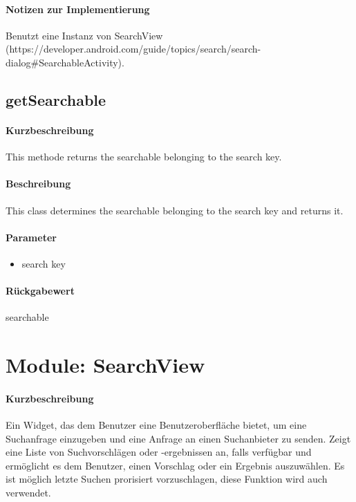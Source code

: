 \paragraph*{Notizen zur Implementierung}
Benutzt eine Instanz von SearchView (https://developer.android.com/guide/topics/search/search-dialog#SearchableActivity).

\subsection{getSearchable}%
\paragraph*{Kurzbeschreibung}
This methode returns the searchable belonging to the search key.
\paragraph*{Beschreibung}
This class determines the searchable belonging to the search key and returns it.
\paragraph*{Parameter}
\begin{itemize}
    \item search key
\end{itemize}
\paragraph*{Rückgabewert}
searchable


\section{Module: SearchView}
\paragraph*{Kurzbeschreibung}
Ein Widget, das dem Benutzer eine Benutzeroberfläche bietet, um eine Suchanfrage einzugeben und eine Anfrage an einen Suchanbieter zu senden. 
Zeigt eine Liste von Suchvorschlägen oder -ergebnissen an, falls verfügbar 
und ermöglicht es dem Benutzer, einen Vorschlag oder ein Ergebnis auszuwählen.
Es ist möglich letzte Suchen prorisiert vorzuschlagen, diese Funktion wird auch verwendet.
